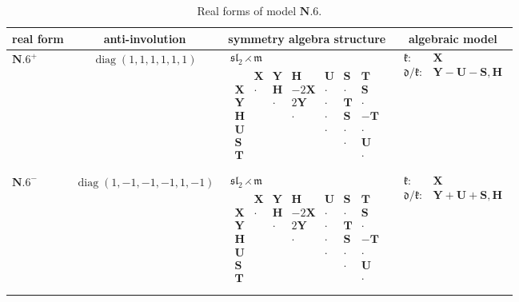 \documentclass[pdftex]{sigma}
\DeclareMathOperator{\diag}{diag}
\newcommand{\mbH}{\mathbf{H}}
\newcommand{\mbS}{\mathbf{S}}
\newcommand{\mbT}{\mathbf{T}}
\newcommand{\mbU}{\mathbf{U}}
\newcommand{\mbX}{\mathbf{X}}
\newcommand{\mbY}{\mathbf{Y}}
\newcommand{\mfd} {\mathfrak{d}}
\newcommand{\mfk} {\mathfrak{k}}
\newcommand{\mfm} {\mathfrak{m}}
\newcommand{\mfsl} {\mathfrak{sl}}
\numberwithin{equation}{section}
\begin{document}
\begin{table}[th!]
\caption{Real forms of model $\mathbf{N.6}$.}\label{table:real-N.6}\vspace{1mm}

\tiny
\centering
\begin{tabular}{lccl}
\toprule
 real form
 & anti-involution
 & symmetry algebra structure
 & \multicolumn{1}{c}{algebraic model} \\
\midrule
 $\mathbf{N.6}^+$
 & $\diag(1,1,1,1,1,1)$
 &
 $\begin{array}{c}
 \mfsl_2 \rightthreetimes \mfm \\
 \begin{array}{c|cccccc}
 & \mbX & \mbY & \mbH & \mbU & \mbS & \mbT \\
	 \hline
 \mbX & \cdot & \mbH & -2 \mbX & \cdot & \cdot & \mbS \\
 \mbY & & \cdot & 2 \mbY & \cdot & \mbT & \cdot \\
 \mbH & & & \cdot & \cdot & \mbS & -\mbT \\
 \mbU & & & & \cdot & \cdot & \cdot \\
 \mbS & & & & & \cdot & \mbU \\
 \mbT & & & & & & \cdot \\
 \end{array}
 \end{array}$
 & $\begin{array}{rl}
 \mfk\colon
 &\!\!\!\!\!\! \mbX \\
	 \mfd / \mfk\colon
 &\!\!\!\!\!\! \mbY - \mbU - \mbS, \mbH
 \end{array}$ \\
\cmidrule{1-4}
 $\mathbf{N.6}^-$
 & $\diag(1, -1, -1, -1, 1, -1)$
 &
 $\begin{array}{c}
 \mfsl_2 \rightthreetimes \mfm \\
 \begin{array}{c|cccccc}
 & \mbX & \mbY & \mbH & \mbU & \mbS & \mbT \\
	 \hline
 \mbX & \cdot & \mbH & -2 \mbX & \cdot & \cdot & \mbS \\
 \mbY & & \cdot & 2 \mbY & \cdot & \mbT & \cdot \\
 \mbH & & & \cdot & \cdot & \mbS & -\mbT \\
 \mbU & & & & \cdot & \cdot & \cdot \\
 \mbS & & & & & \cdot & \mbU \\
 \mbT & & & & & & \cdot \\
 \end{array}
 \end{array}$
 & $\begin{array}{rl}
 \mfk\colon
 &\!\!\!\!\!\! \mbX \\
	 \mfd / \mfk\colon
 &\!\!\!\!\!\! \mbY + \mbU + \mbS, \mbH
 \end{array}$ \\
\bottomrule
\end{tabular}


\end{table}
\end{document}
